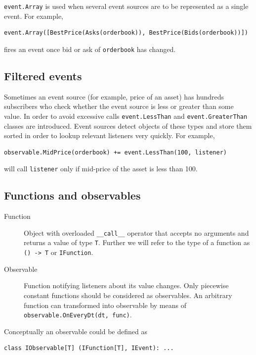 \documentclass[a4paper,11pt]{article}
\begin{document}
\texttt{event.Array} is used when several event sources are to be
represented as a single event. For example,

\begin{verbatim}
event.Array([BestPrice(Asks(orderbook)), BestPrice(Bids(orderbook))])
\end{verbatim}

fires an event once bid or ask of \texttt{orderbook} has changed.

\subsection{Filtered events}\label{filtered-events}

Sometimes an event source (for example, price of an asset) has hundreds
subscribers who check whether the event source is less or greater than some
value. In order to avoid excessive calls \texttt{event.LessThan} and
\texttt{event.GreaterThan} classes are introduced. Event sources detect
objects of these types and store them sorted in order to lookup relevant
listeners very quickly. For example,

\begin{verbatim}
observable.MidPrice(orderbook) += event.LessThan(100, listener)
\end{verbatim}

will call \texttt{listener} only if mid-price of the asset is less than
100.

\subsection{Functions and observables}\label{functions-and-observables}

\begin{description}
\item[Function]
Object with overloaded \texttt{\_\_call\_\_} operator that accepts no
arguments and returns a value of type \texttt{T}. Further we will refer
to the type of a function as \texttt{() -\textgreater{} T} or
\texttt{IFunction}.
\item[Observable]
Function notifying listeners about its value changes. Only piecewise
constant functions should be considered as observables. An arbitrary
function can transformed into observable by means of
\texttt{observable.OnEveryDt(dt, func)}.
\end{description}

Conceptually an observable could be defined as

\begin{verbatim}
class IObservable[T] (IFunction[T], IEvent): ...
\end{verbatim}
\end{document}
